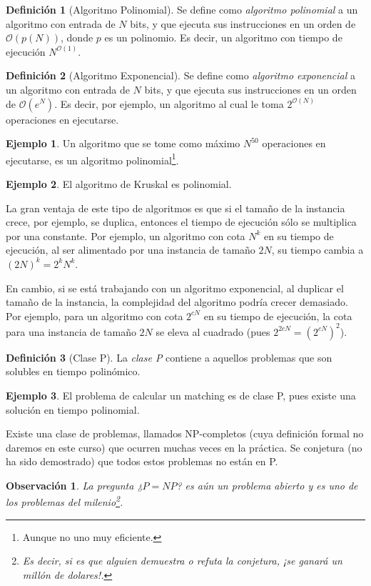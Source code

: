 \documentclass[10pt]{article}
\newcommand{\Ord}[1][n]{\ensuremath{ \mathcal{O}(#1) }}
\theoremstyle{plain}
\newtheorem{obs}{Observaci\'on}
\theoremstyle{definition}
\newtheorem{defi}{Definición}
\newtheorem{eje}{Ejemplo}
\begin{document}
\begin{defi}[Algoritmo Polinomial]
Se define como \textit{algoritmo polinomial} a un algoritmo con entrada de $N$ bits, y que ejecuta sus instrucciones en un orden de \Ord[p(N)], donde $p$ es un polinomio. Es decir, un algoritmo con tiempo de ejecución $N^{\Ord[1]}$.
\end{defi}
\begin{defi}[Algoritmo Exponencial]
Se define como \textit{{algoritmo exponencial}} a un algoritmo con entrada de $N$ bits, y que ejecuta sus instrucciones en un orden de \Ord[e^{N}]. Es decir, por ejemplo, un algoritmo al cual le toma $2^{\Ord[N]}$ operaciones en ejecutarse.
\end{defi}
\begin{eje}
Un algoritmo que se tome como máximo $N^{50}$ operaciones en ejecutarse, es un algoritmo polinomial\footnote{Aunque no uno muy eficiente.}.
\end{eje}
\begin{eje}
El algoritmo de Kruskal es polinomial.
\end{eje}
La gran ventaja de este tipo de algoritmos es que si el tamaño de la instancia crece, por ejemplo, se duplica, entonces el tiempo de ejecución sólo se multiplica por una constante. Por ejemplo, un algoritmo con cota $N^k$ en su tiempo de ejecución, al ser alimentado por una instancia de tamaño $2N$, su tiempo cambia a $(2N)^{k}=2^k N^k$.

En cambio, si se está trabajando con un algoritmo exponencial, al duplicar el tamaño de la instancia, la complejidad del algoritmo podría crecer demasiado. Por ejemplo, para un algoritmo con cota $2^{cN}$ en su tiempo de ejecución, la cota para una instancia de tamaño $2N$ se eleva al cuadrado (pues $2^{2cN}=(2^{cN})^2$).

\begin{defi}[Clase P]
La \textit{{clase P}} contiene a aquellos problemas que son solubles en tiempo polinómico.
\end{defi}
\begin{eje}
El problema de calcular un matching es de clase P, pues existe una solución en tiempo polinomial.
\end{eje}

Existe una clase de problemas, llamados NP-completos (cuya definición formal no daremos en este curso) que ocurren muchas veces en la práctica. Se conjetura (no ha sido demostrado) que todos estos problemas no están en P.

\begin{obs}
La pregunta ¿$P=NP$? es aún un problema abierto y es uno de los problemas del milenio\footnote{Es decir, si es que alguien demuestra o refuta la conjetura, ¡se ganará un millón de dolares!.}.
\end{obs}
\end{document}
